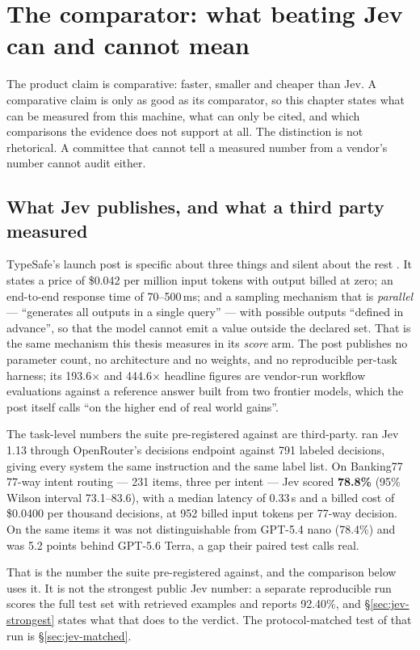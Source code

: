 \chapter[The comparator]{The comparator: what beating Jev can and cannot mean}
\label{ch:comparator}

The product claim is comparative: faster, smaller and cheaper than Jev. A
comparative claim is only as good as its comparator, so this chapter states
what can be measured from this machine, what can only be cited, and which
comparisons the evidence does not support at all. The distinction is not
rhetorical. A committee that cannot tell a measured number from a vendor's
number cannot audit either.

\section{What Jev publishes, and what a third party measured}

TypeSafe's launch post is specific about three things and silent about the
rest \citep{typesafe2026jev}. It states a price of \$0.042 per million input
tokens with output billed at zero; an end-to-end response time of 70--500\,ms;
and a sampling mechanism that is \emph{parallel} --- ``generates all outputs in
a single query'' --- with possible outputs ``defined in advance'', so that the
model cannot emit a value outside the declared set. That is the same mechanism
this thesis measures in its \emph{score} arm. The post publishes no parameter
count, no architecture and no weights, and no reproducible per-task harness; its 193.6$\times$
and 444.6$\times$ headline figures are vendor-run workflow evaluations against
a reference answer built from two frontier models, which the post itself calls
``on the higher end of real world gains''.

The task-level numbers the suite pre-registered against are third-party. \citet{ayautomate2026jev}
ran Jev 1.13 through OpenRouter's decisions endpoint against 791 labeled
decisions, giving every system the same instruction and the same label list.
On Banking77 77-way intent routing --- 231 items, three per intent --- Jev
scored \textbf{78.8\%} (95\% Wilson interval 73.1--83.6), with a median latency
of 0.33\,s and a billed cost of \$0.0400 per thousand decisions, at 952 billed
input tokens per 77-way decision. On the same items it was not distinguishable
from GPT-5.4 nano (78.4\%) and was 5.2 points behind GPT-5.6 Terra, a gap their
paired test calls real.

That is the number the suite pre-registered against, and the comparison below
uses it. It is not the strongest public Jev number: a separate reproducible run
scores the full test set with retrieved examples and reports 92.40\%, and
\S\ref{sec:jev-strongest} states what that does to the verdict. The
protocol-matched test of that run is \S\ref{sec:jev-matched}.

